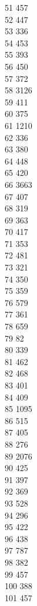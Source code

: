 { 51	457 \\
 52	447 \\
 53	336 \\
 54	453 \\
 55	393 \\
 56	450 \\
 57	372 \\
 58	3126 \\
 59	411 \\
 60	375 \\
 61	1210 \\
 62	336 \\
 63	380 \\
 64	448 \\
 65	420 \\
 66	3663 \\
 67	407 \\
 68	319 \\
 69	363 \\
 70	417 \\
 71	353 \\
 72	481 \\
 73	321 \\
 74	350 \\
 75	359 \\
 76	579 \\
 77	361 \\
 78	659 \\
 79	82 \\
 80	339 \\
 81	462 \\
 82	468 \\
 83	401 \\
 84	409 \\
 85	1095 \\
 86	515 \\
 87	405 \\
 88	276 \\
 89	2076 \\
 90	425 \\
 91	397 \\
 92	369 \\
 93	528 \\
 94	296 \\
 95	422 \\
 96	438 \\
 97	787 \\
 98	382 \\
 99	457 \\
 100	388 \\
 101	457 \\
}
